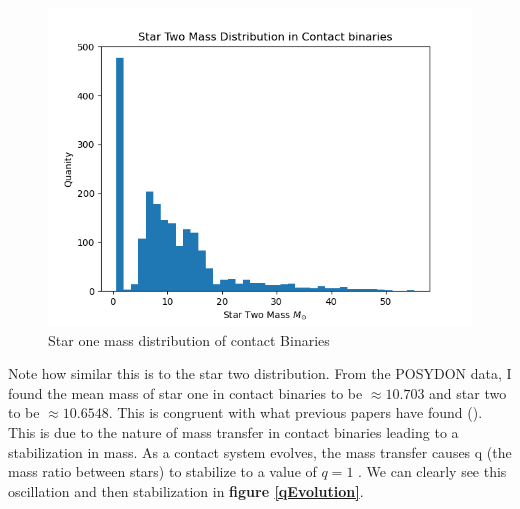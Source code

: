 \documentclass[12pt, a4paper]{article}
\begin{document}
        \begin{figure}[H]
            \centering
            \includegraphics[scale = .6]{figs/GeneratedFigs/Contact binaries Star Two Mass Distribution.png}
            \caption{Star one mass distribution of contact Binaries}
            \label{contactBinarStar1MassDistro}
        \end{figure}

        Note how similar this is to the star two distribution. From the POSYDON data, I found the mean mass of star one in contact binaries to be $\approx 10.703$ and star two to be $\approx 10.6548$. This is congruent with what previous papers have found (\parencite{Fabry_2025}). This is due to the nature of mass transfer in contact binaries leading to a stabilization in mass. As a contact system evolves, the mass transfer causes q (the mass ratio between stars) to stabilize to a value of $q=1$ \parencite{Fabry_2025}. We can clearly see this oscillation and then stabilization in \textbf{figure \ref{qEvolution}}.
\end{document}
